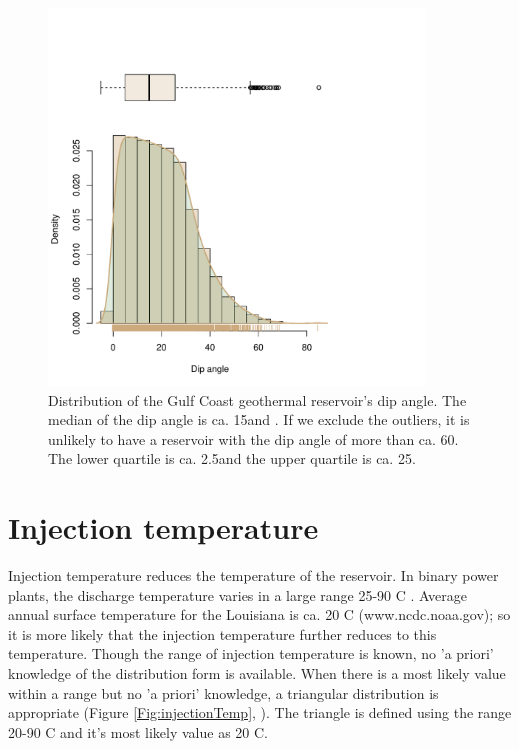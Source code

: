 \documentclass[review,authoryear, 12pt]{elsarticle}\usepackage[]{graphicx}\usepackage[]{color}
\newenvironment{knitrout}{}{} %
\begin{document}
\begin{knitrout}
\color{fgcolor}\begin{figure}[]


{\centering \includegraphics[width=10cm,height=10cm]{figure/dip_angle} 

}

\caption[Distribution of the Gulf Coast geothermal reservoir's dip angle]{Distribution of the Gulf Coast geothermal reservoir's dip angle. The median of the dip angle is ca. 15\degree and . If we exclude the outliers, it is unlikely to have a reservoir with the dip angle of more than ca. 60\degree. The lower quartile is ca. 2.5\degree and the upper quartile is ca. 25\degree.\label{Fig:dip_angle}}
\end{figure}


\end{knitrout}


\section{Injection temperature}
Injection temperature reduces the temperature of the reservoir. In binary power plants, the discharge temperature varies in a large range 25-90 \degree C \citep{tester2006future}. Average annual surface temperature for the Louisiana is ca. 20 \degree C (www.ncdc.noaa.gov); so it is more likely that the injection temperature further reduces to this temperature. Though the range of injection temperature is known, no 'a priori' knowledge of the distribution form is available. When there is a most likely value within a range but no 'a priori' knowledge, a triangular distribution is appropriate (Figure \ref{Fig:injectionTemp}, \citet{jensen2000statistics}). The triangle is defined using the range 20-90 \degree C and it's most likely value as 20 \degree C.
\end{document}
